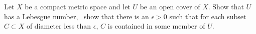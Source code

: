 Let $X$ be a compact metric space and let $U$ be an open cover of
$X$. Show that $U$ has a Lebesgue number, \ie\ show that there is an
$\epsilon>0$ such that for each subset $C\subset X$ of diameter less
than $\epsilon$, $C$ is contained in some member of $U$.
